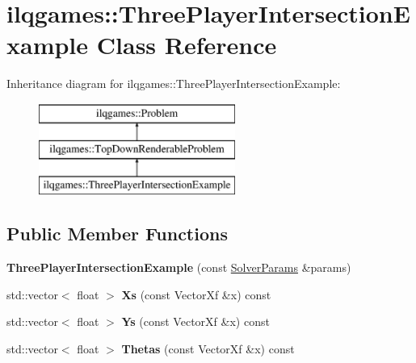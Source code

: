 \hypertarget{classilqgames_1_1_three_player_intersection_example}{}\section{ilqgames\+:\+:Three\+Player\+Intersection\+Example Class Reference}
\label{classilqgames_1_1_three_player_intersection_example}
Inheritance diagram for ilqgames\+:\+:Three\+Player\+Intersection\+Example\+:\begin{figure}[H]
\begin{center}
\leavevmode
\includegraphics[height=3.000000cm]{classilqgames_1_1_three_player_intersection_example}
\end{center}
\end{figure}
\subsection*{Public Member Functions}
\begin{DoxyCompactItemize}
\item 
{\bfseries Three\+Player\+Intersection\+Example} (const \hyperlink{structilqgames_1_1_solver_params}{Solver\+Params} \&params)\hypertarget{classilqgames_1_1_three_player_intersection_example_af9f970a8a99ed255a81a12fbcb4328af}{}\label{classilqgames_1_1_three_player_intersection_example_af9f970a8a99ed255a81a12fbcb4328af}

\item 
std\+::vector$<$ float $>$ {\bfseries Xs} (const Vector\+Xf \&x) const \hypertarget{classilqgames_1_1_three_player_intersection_example_ae81326cb33320fb55eac09dc009cdc26}{}\label{classilqgames_1_1_three_player_intersection_example_ae81326cb33320fb55eac09dc009cdc26}

\item 
std\+::vector$<$ float $>$ {\bfseries Ys} (const Vector\+Xf \&x) const \hypertarget{classilqgames_1_1_three_player_intersection_example_aeb38711ec9f6dd776ba359485f7e981a}{}\label{classilqgames_1_1_three_player_intersection_example_aeb38711ec9f6dd776ba359485f7e981a}

\item 
std\+::vector$<$ float $>$ {\bfseries Thetas} (const Vector\+Xf \&x) const \hypertarget{classilqgames_1_1_three_player_intersection_example_a74b3ff1cc6bbb27ea3e673792f623a61}{}\label{classilqgames_1_1_three_player_intersection_example_a74b3ff1cc6bbb27ea3e673792f623a61}

\end{DoxyCompactItemize}
